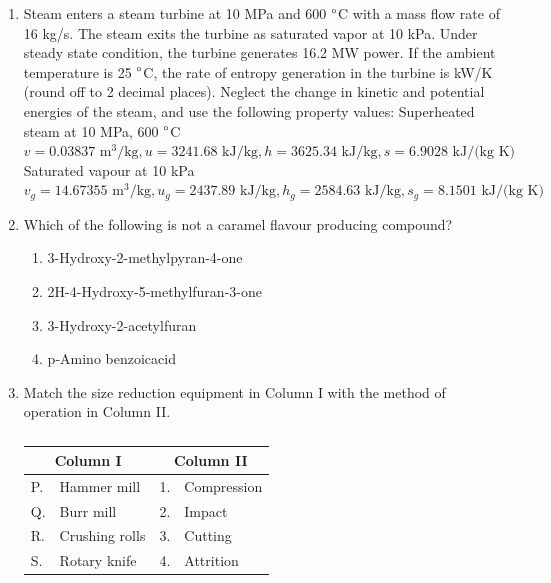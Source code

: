\documentclass[a4paper,10pt]{article}
\begin{document}
\begin{enumerate}
\hfill{}

\item Steam enters a steam turbine at 10 MPa and 600 $\degree$C with a mass flow rate of 16 kg/s. The steam exits the turbine as saturated vapor at 10 kPa. Under steady state condition, the turbine generates 16.2 MW power. If the ambient temperature is 25 $\degree$C, the rate of entropy generation in the turbine is \underline{\hspace{2cm}} kW/K (round off to 2 decimal places).
Neglect the change in kinetic and potential energies of the steam, and use the following property values:
Superheated steam at 10 MPa, 600 $\degree$C
$v = 0.03837 \text{ m}^3/\text{kg}, u = 3241.68 \text{ kJ/kg}, h = 3625.34 \text{ kJ/kg}, s = 6.9028 \text{ kJ/(kg K)}$
Saturated vapour at 10 kPa
$v_g = 14.67355 \text{ m}^3/\text{kg}, u_g = 2437.89 \text{ kJ/kg}, h_g = 2584.63 \text{ kJ/kg}, s_g = 8.1501 \text{ kJ/(kg K)}$

\hfill{}

\item Which of the following is not a caramel flavour producing compound?

\hfill{}
\begin{enumerate}
    \item 3-Hydroxy-2-methylpyran-4-one
    \item 2H-4-Hydroxy-5-methylfuran-3-one
    \item 3-Hydroxy-2-acetylfuran
    \item p-Amino benzoicacid
\end{enumerate}

\item Match the size reduction equipment in Column I with the method of operation in Column II.
\begin{table}[h]
    \centering
    \begin{tabular}{|ll|ll|}
    \hline
    \multicolumn{2}{|c|}{\textbf{Column I}} & \multicolumn{2}{c|}{\textbf{Column II}} \\
    \hline
    P. & Hammer mill & 1. & Compression \\
    Q. & Burr mill & 2. & Impact \\
    R. & Crushing rolls & 3. & Cutting \\
    S. & Rotary knife & 4. & Attrition \\
    \hline
    \end{tabular}
    \caption*{}
    \label{tab:q144}
\end{table}


\end{enumerate}
\end{document}
